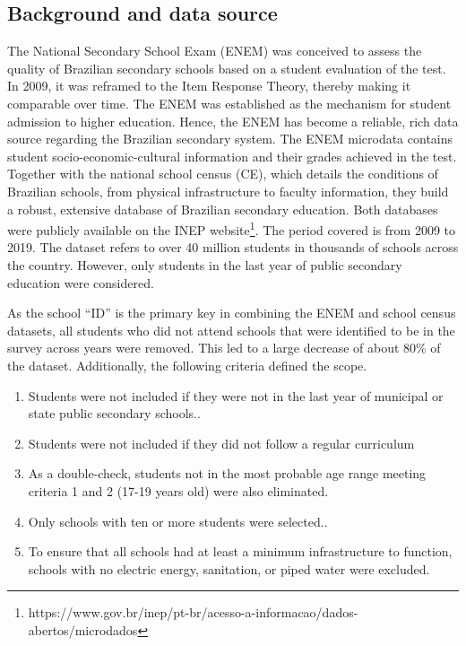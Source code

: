 \subsection{Background and data source}

The National Secondary School Exam (ENEM) was conceived to assess the quality of Brazilian secondary schools based on a student evaluation of the test. In 2009, it was reframed to the Item Response Theory, thereby making it comparable over time. The ENEM was established as the mechanism for student admission to higher education. Hence, the ENEM has become a reliable, rich data source regarding the Brazilian secondary system. The ENEM microdata contains student socio-economic-cultural information and their grades achieved in the test. Together with the national school census (CE), which details the conditions of Brazilian schools, from physical infrastructure to faculty information, they build a robust, extensive database of Brazilian secondary education. Both databases were publicly available on the INEP website\footnote{  https://www.gov.br/inep/pt-br/acesso-a-informacao/dados-abertos/microdados}. The period covered is from 2009 to 2019. The dataset refers to over 40 million students in thousands of schools across the country. However, only students in the last year of public secondary education were considered. 

As the school “ID” is the primary key in combining the ENEM and school census datasets, all students who did not attend schools that were identified to be in the survey across years were removed. This led to a large decrease of about 80\% of the dataset. Additionally, the following criteria defined the scope.

\begin{enumerate}
\item Students were not included if they were not in the last year of municipal or state public secondary schools..
\item Students were not included if they did not follow a regular curriculum
\item As a double-check, students not in the most probable age range meeting criteria 1 and 2 (17-19 years old) were also eliminated.
\item Only schools with ten or more students were selected..
\item To ensure that all schools had at least a minimum infrastructure to function, schools with no electric energy, sanitation, or piped water were excluded.
\end{enumerate}





